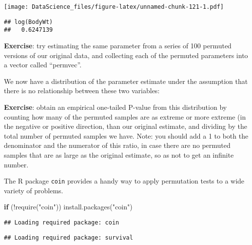 \documentclass[
]{book}
\newenvironment{Shaded}{\begin{snugshade}}{\end{snugshade}}
\newcommand{\AttributeTok}[1]{\textcolor[rgb]{0.77,0.63,0.00}{#1}}
\newcommand{\ControlFlowTok}[1]{\textcolor[rgb]{0.13,0.29,0.53}{\textbf{#1}}}
\newcommand{\DecValTok}[1]{\textcolor[rgb]{0.00,0.00,0.81}{#1}}
\newcommand{\FunctionTok}[1]{\textcolor[rgb]{0.00,0.00,0.00}{#1}}
\newcommand{\NormalTok}[1]{#1}
\newcommand{\OtherTok}[1]{\textcolor[rgb]{0.56,0.35,0.01}{#1}}
\newcommand{\SpecialCharTok}[1]{\textcolor[rgb]{0.00,0.00,0.00}{#1}}
\newcommand{\StringTok}[1]{\textcolor[rgb]{0.31,0.60,0.02}{#1}}
\begin{document}
\texttt{[image: DataScience\_files/figure-latex/unnamed-chunk-121-1.pdf]}

\begin{Shaded}
\end{Shaded}

\begin{verbatim}
## log(BodyWt) 
##   0.6247139
\end{verbatim}

\textbf{Exercise}: try estimating the same parameter from a series of 100 permuted versions of our original data, and collecting each of the permuted parameters into a vector called ``permvec''.

We now have a distribution of the parameter estimate under the assumption that there is no relationship between these two variables:

\textbf{Exercise}: obtain an empirical one-tailed P-value from this distribution by counting how many of the permuted samples are as extreme or more extreme (in the negative or positive direction, than our original estimate, and dividing by the total number of permuted samples we have. Note: you should add a 1 to both the denominator and the numerator of this ratio, in case there are no permuted samples that are as large as the original estimate, so as not to get an infinite number.

The R package \texttt{coin} provides a handy way to apply permutation tests to a wide variety of problems.

\begin{Shaded}
\begin{Highlighting}[]
\ControlFlowTok{if}\NormalTok{ (}\SpecialCharTok{!}\FunctionTok{require}\NormalTok{(}\StringTok{"coin"}\NormalTok{)) }\FunctionTok{install.packages}\NormalTok{(}\StringTok{"coin"}\NormalTok{)}
\end{Highlighting}
\end{Shaded}

\begin{verbatim}
## Loading required package: coin
\end{verbatim}

\begin{verbatim}
## Loading required package: survival
\end{verbatim}
\end{document}
